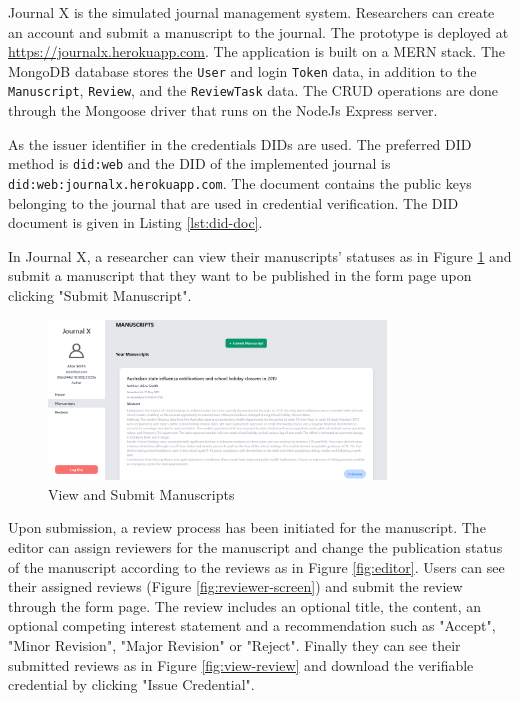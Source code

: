 Journal X is the simulated journal management system. Researchers can create an account and submit a manuscript to the journal. The prototype is deployed at \url{https://journalx.herokuapp.com}. The application is built on a \acrshort{MERN} stack. The MongoDB database stores the \lstinline{User} and login \lstinline{Token} data, in addition to the \lstinline{Manuscript}, \lstinline{Review}, and the \lstinline{ReviewTask} data. The \acrshort{CRUD} operations are done through the Mongoose driver that runs on the NodeJs Express server.

As the issuer identifier in the credentials \acrshort{DID}s are used. The preferred \acrshort{DID} method is \lstinline{did:web} and the \acrshort{DID} of the implemented journal is \lstinline{did:web:journalx.herokuapp.com}. The document contains the public keys belonging to the journal that are used in credential verification. The \acrshort{DID} document is given in Listing \ref{lst:did-doc}.



In Journal X, a researcher can view their manuscripts' statuses as in Figure  \ref{fig:submit-manuscript} and submit a manuscript that they want to be published in the form page upon clicking "Submit Manuscript". 

\begin{figure}[htpb]
  \centering
  \includegraphics[width=0.8\textwidth]{figures/submitManuscript.png}
  \caption{View and Submit Manuscripts} \label{fig:submit-manuscript}
\end{figure}

Upon submission, a review process has been initiated for the manuscript. The editor can assign reviewers for the manuscript and change the publication status of the manuscript according to the reviews as in Figure \ref{fig:editor}. Users can see their assigned reviews (Figure \ref{fig:reviewer-screen}) and submit the review through the form page. The review includes an optional title, the content, an optional competing interest statement and a recommendation such as "Accept", "Minor Revision", "Major Revision" or "Reject". Finally they can see their submitted reviews as in Figure \ref{fig:view-review} and download the verifiable credential by clicking "Issue Credential".

